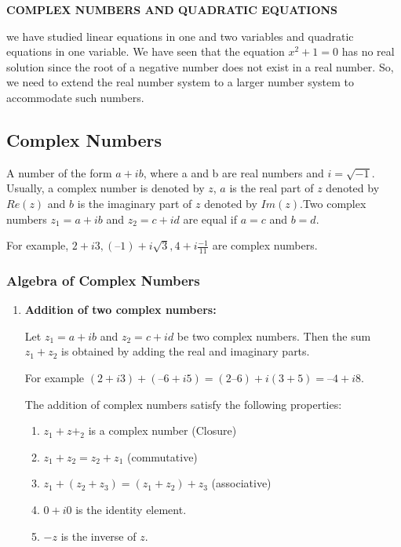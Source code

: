 \documentclass{article}
\begin{document}
\begin{center}
    {\LARGE \textbf{COMPLEX NUMBERS AND QUADRATIC EQUATIONS} }
\end{center}

\begin{multicols}{2}
  we have studied linear equations in one and two variables and quadratic equations in one variable. We have seen that the equation $x^2 + 1 = 0$ has no real solution since the root of a negative number does not exist in a real number. So, we need to extend the real number system to a larger number system to accommodate such numbers.

\subsection*{Complex Numbers}
  A number of the form $a + ib$, where a and b are real numbers and $i = \sqrt{-1}$.
Usually, a complex number is denoted by $z$, $a$ is the real part of $z$ denoted by $Re(z)$ and $b$ is the imaginary part of $z$ denoted by $Im(z)$.Two complex numbers $z_1 = a + ib$ and $z_2 = c + id$ are equal if $a = c$ and $b = d.$

For example, $2 + i3, (– 1) + i \sqrt{3} , 4 + i \frac{-1}{11} $ are complex numbers.

\subsubsection*{ Algebra of Complex Numbers}

\begin{enumerate}
    \item \textbf{Addition of two complex numbers:}
    
    Let $z_1 = a + ib$ and $z_2 = c + id$ be two complex numbers. Then the sum $z_1 + z_2$ is obtained by adding the real and imaginary parts.

    For example $(2 + i3) + (– 6 +i5) = (2 – 6) + i (3 + 5) = – 4 + i 8$. 

    The addition of complex numbers satisfy the following properties: \begin{enumerate}
        \item $z_1 + z+_2$ is a complex number (Closure)
        \item  $z_1 + z_2 = z_2 + z_1$ (commutative)
        \item  $z_1 + (z_2 + z_3) = (z_1 + z_2) + z_3$ (associative)
        \item $0 + i0$ is the identity element.
        \item  $-z$ is the inverse of $z$.
        

\end{enumerate}
\end{enumerate}
\end{multicols}
\end{document}
